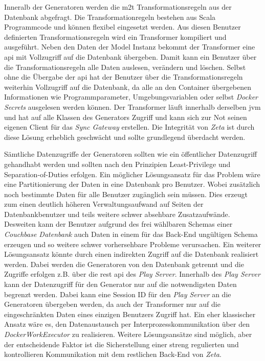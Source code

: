 Inneralb der Generatoren werden die \ac{m2t} Transformationsregeln aus der Datenbank abgefragt. Die Transformationregeln bestehen aus Scala Programmcode und können flexibel eingesetzt werden. Aus diesen Benutzer definierten Transformationsregeln wird ein Transformer kompiliert und ausgeführt. Neben den Daten der Model Instanz bekommt der Transformer eine \ac{api} mit Vollzugriff auf die Datenbank übergeben. Damit kann ein Benutzer über die Transformationsregeln alle Daten auslesen, verändern und löschen. Selbst ohne die Übergabe der \ac{api} hat der Benutzer über die Transformationsregeln weiterhin Vollzugriff auf die Datenbank, da alle an den Container übergebenen Informationen wie Programmparameter, Umgebungsvariablen oder selbst \textit{Docker Secrets} ausgelesen werden können. Der Transformer läuft innerhalb derselben \ac{jvm} und hat auf alle Klassen des Generators Zugriff und kann sich zur Not seinen eigenen Client für das \textit{Sync Gateway} erstellen. Die Integrität von \textit{Zeta} ist durch diese Lösung erheblich geschwächt und sollte grundlegend überdacht werden.

Sämtliche Datenzugriffe der Generatoren sollten wie ein öffentlicher Datenzugriff gehandhabt werden und sollten nach den Prinzipien Least-Privilege und Separation-of-Duties erfolgen. Ein möglicher Lösungsansatz für das Problem wäre eine Partitionierung der Daten in eine Datenbank pro Benutzer. Wobei zusätzlich noch bestimmte Daten für alle Benutzer zugänglich sein müssen. Dies erzeugt zum einen deutlich höheren Verwaltungsaufwand auf Seiten der Datenbankbenutzer und teils weitere schwer absehbare Zusatzaufwände. Desweiten kann der Benutzer aufgrund des frei wählbaren Schemas einer \textit{Couchbase Datenbank} auch Daten in einem für das Back-End ungültigen Schema erzeugen und so weitere schwer vorhersehbare Probleme verursachen.  Ein weiterer Lösungsansatz könnte durch einen indirekten Zugriff auf die Datenbank realisiert werden. Dabei werden die Generatoren von den Datenbank getrennt und  die Zugriffe erfolgen z.B. über die \ac{rest} \ac{api} des \textit{Play Server}. Innerhalb des \textit{Play Server} kann der Datenzugriff für den Generator nur auf die notwendigsten Daten begrenzt werden. Dabei kann eine Session ID für den \textit{Play Server} an die Generatoren übergeben werden, da auch der Transformer nur auf die eingeschränkten Daten eines einzigen Benutzers Zugriff hat. Ein eher klassischer Ansatz wäre es, den Datenaustausch per Interprozesskommunikation über den \textit{DockerWorkExecutor} zu realisieren. Weitere Lösungsansätze sind möglich, aber der entscheidende Faktor ist die Sicherstellung einer streng regulierten und kontrollieren Kommunikation mit dem restlichen Back-End von \textit{Zeta}.

